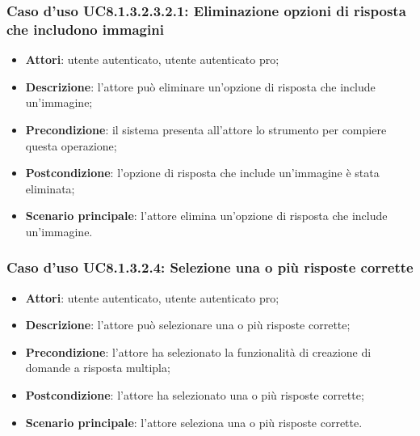 \subsubsection{Caso d'uso UC8.1.3.2.3.2.1: Eliminazione opzioni di risposta che includono immagini}
		\begin{itemize}
		\item
			\textbf{Attori}: utente autenticato, utente autenticato pro;
		\item		
			\textbf{Descrizione}: l'attore può eliminare un'opzione di risposta che include un'immagine;
		\item
			\textbf{Precondizione}: il sistema presenta all'attore lo strumento per compiere questa operazione;
		\item
			\textbf{Postcondizione}: l'opzione di risposta che include un'immagine è stata eliminata;
		\item
			\textbf{Scenario principale}: l'attore elimina un'opzione di risposta che include un'immagine.				
		\end{itemize}
\subsubsection{Caso d'uso UC8.1.3.2.4: Selezione una o più risposte corrette}
	\begin{itemize}
		\item
			\textbf{Attori}: utente autenticato, utente autenticato pro;
		\item		
			\textbf{Descrizione}: l'attore può selezionare una o più risposte corrette;
		\item
			\textbf{Precondizione}: l'attore ha selezionato la funzionalità di creazione di domande a risposta multipla; 
		\item
			\textbf{Postcondizione}: l'attore ha selezionato una o più risposte corrette;
		\item
			\textbf{Scenario principale}: l'attore seleziona una o più risposte corrette. 			
	\end{itemize}

	
	
	
	
	
	
	